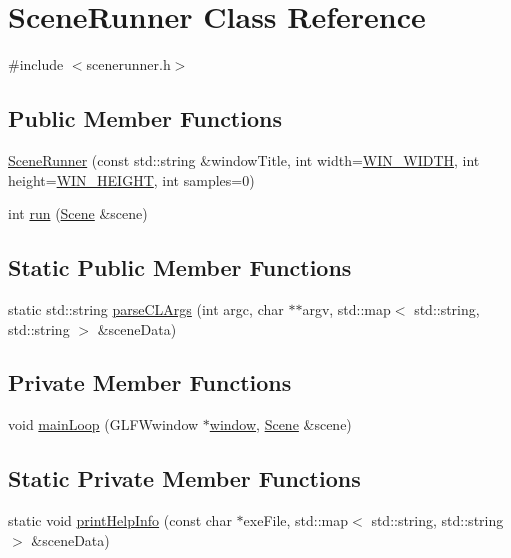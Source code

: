 \hypertarget{class_scene_runner}{}\section{Scene\+Runner Class Reference}
\label{class_scene_runner}


{\ttfamily \#include $<$scenerunner.\+h$>$}

\subsection*{Public Member Functions}
\begin{DoxyCompactItemize}
\item 
\mbox{\hyperlink{class_scene_runner_adea055db042421bb84452dda5d404b61}{Scene\+Runner}} (const std\+::string \&window\+Title, int width=\mbox{\hyperlink{scenerunner_8h_a2e6ef411e0ff00ad889788b6cde701b5}{W\+I\+N\+\_\+\+W\+I\+D\+TH}}, int height=\mbox{\hyperlink{scenerunner_8h_a0a33b1743038db1adbbf1045aa839b38}{W\+I\+N\+\_\+\+H\+E\+I\+G\+HT}}, int samples=0)
\item 
int \mbox{\hyperlink{class_scene_runner_aac9e52b035be76abd82181044f871ccd}{run}} (\mbox{\hyperlink{class_scene}{Scene}} \&scene)
\end{DoxyCompactItemize}
\subsection*{Static Public Member Functions}
\begin{DoxyCompactItemize}
\item 
static std\+::string \mbox{\hyperlink{class_scene_runner_a4ab05aea0a40be8973af80b1c100846c}{parse\+C\+L\+Args}} (int argc, char $\ast$$\ast$argv, std\+::map$<$ std\+::string, std\+::string $>$ \&scene\+Data)
\end{DoxyCompactItemize}
\subsection*{Private Member Functions}
\begin{DoxyCompactItemize}
\item 
void \mbox{\hyperlink{class_scene_runner_aaf7581cf0e51977da02c58c088fd1cc2}{main\+Loop}} (G\+L\+F\+Wwindow $\ast$\mbox{\hyperlink{class_scene_runner_a3b5f5327fe99c632c23b24e070956412}{window}}, \mbox{\hyperlink{class_scene}{Scene}} \&scene)
\end{DoxyCompactItemize}
\subsection*{Static Private Member Functions}
\begin{DoxyCompactItemize}
\item 
static void \mbox{\hyperlink{class_scene_runner_a6fa80fefb3e46bed4859000c1a730909}{print\+Help\+Info}} (const char $\ast$exe\+File, std\+::map$<$ std\+::string, std\+::string $>$ \&scene\+Data)
\end{DoxyCompactItemize}

